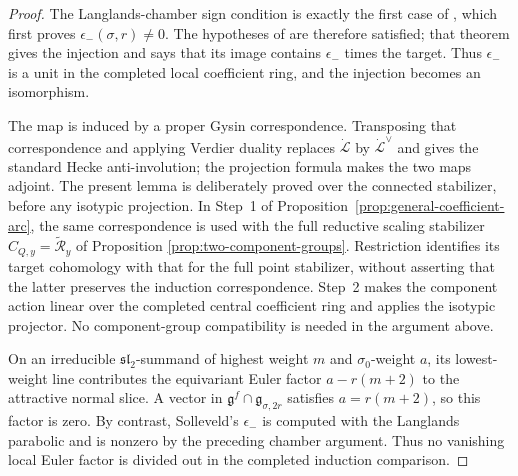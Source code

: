 \documentclass[11pt]{amsart}
\theoremstyle{definition}
\theoremstyle{remark}
\begin{document}
\begin{proof}
The Langlands-chamber sign condition is exactly the first case of
\cite[Lemma~B.3]{Solleveld}, which first proves
$\epsilon_-(\sigma,r)\ne0$.  The hypotheses of
\cite[Theorem~B.2(a)]{Solleveld} are therefore satisfied; that theorem gives
the injection and says that its image contains $\epsilon_-$ times the target.
Thus $\epsilon_-$ is a unit in the completed local
coefficient ring, and the injection becomes an isomorphism.

The map is induced by a proper Gysin correspondence.  Transposing that
correspondence and applying Verdier duality replaces
$\dot{\mathcal L}$ by $\dot{\mathcal L}^{\vee}$ and gives the standard Hecke
anti-involution; the projection formula makes the two maps adjoint.  The
present lemma is deliberately proved over the connected stabilizer, before
any isotypic projection.  In Step~1 of
Proposition~\ref{prop:general-coefficient-arc}, the same correspondence is
used with the full reductive scaling stabilizer
$C_{Q,y}=\widetilde{\mathcal R}_y$ of Proposition
\ref{prop:two-component-groups}.  Restriction identifies its target
cohomology with that for the full point stabilizer, without asserting
that the latter preserves the induction correspondence.  Step~2 makes the component
action linear over the completed central coefficient ring and applies the
isotypic projector.  No component-group compatibility is needed in the
argument above.

On an irreducible $\mathfrak{sl}_2$-summand of highest weight
$m$ and $\sigma_0$-weight $a$, its lowest-weight line contributes the
equivariant Euler factor $a-r(m+2)$ to the attractive normal slice.  A vector in
$\mathfrak g^f\cap\mathfrak g_{\sigma,2r}$ satisfies
$a=r(m+2)$, so this factor is zero.  By contrast, Solleveld's
$\epsilon_-$ is computed with the Langlands parabolic and is nonzero by the
preceding chamber argument.  Thus no vanishing local Euler factor is divided
out in the completed induction comparison.
\end{proof}
\end{document}
